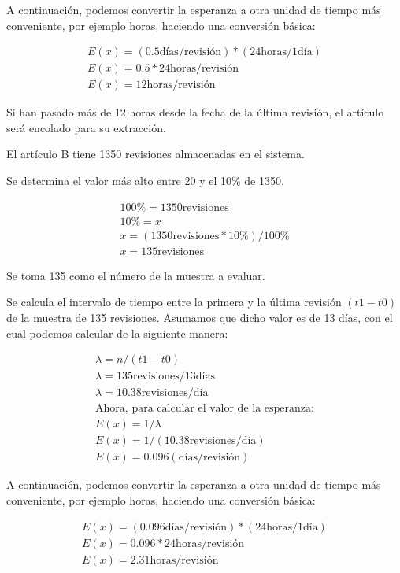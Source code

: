 A continuación, podemos convertir la esperanza a otra unidad de tiempo más conveniente, por ejemplo horas, haciendo una conversión básica:

\begin{gather*}
E(x)= (0.5 \text{días} / \text{revisión}) * (24\text{horas}/1 \text{día})\\
E(x)= 0.5*24 \text{horas} / \text{revisión} \\
E(x) = 12 \text{horas}/ \text{revisión}
\end{gather*}

Si han pasado más de 12 horas desde la fecha de la última revisión, el artículo será encolado para su extracción.

El artículo B tiene 1350 revisiones almacenadas en el sistema.

Se determina el valor más alto entre 20 y el 10\% de 1350.

\begin{gather*}
100\% = 1350 \text{revisiones}\\
10\% = x\\
x = (1350 \text{revisiones} *10\%) / 100\% \\
x = 135 \text{revisiones}
\end{gather*}

Se toma 135 como el número de la muestra a evaluar.

Se calcula el intervalo de tiempo entre la primera y la última revisión $(t1 - t0)$ de la muestra de 135 revisiones.
Asumamos que dicho valor es de 13 días, con el cual podemos calcular  de la siguiente manera:

\begin{gather*}
\lambda = n / (t1 - t0)\\
\lambda = 135 \text{revisiones} / 13 \text{días} \\
\lambda = 10.38 \text{revisiones} / \text{día}\\
\text{Ahora, para calcular el valor de la esperanza:}\\
E(x)= 1 / \lambda\\
E(x)= 1/ ( 10.38 \text{revisiones} / \text{día})\\
E(x)= 0.096 (\text{días} / \text{revisión})
\end{gather*}

A continuación, podemos convertir la esperanza a otra unidad de tiempo más conveniente, por ejemplo horas, haciendo una conversión básica:

\begin{gather*}
E(x) = (0.096 \text{días} / \text{revisión}) * (24\text{horas}/1 \text{día})\\
E(x) = 0.096*24 \text{horas} / \text{revisión}\\
E(x) = 2.31 \text{horas}/ \text{revisión}
\end{gather*}

